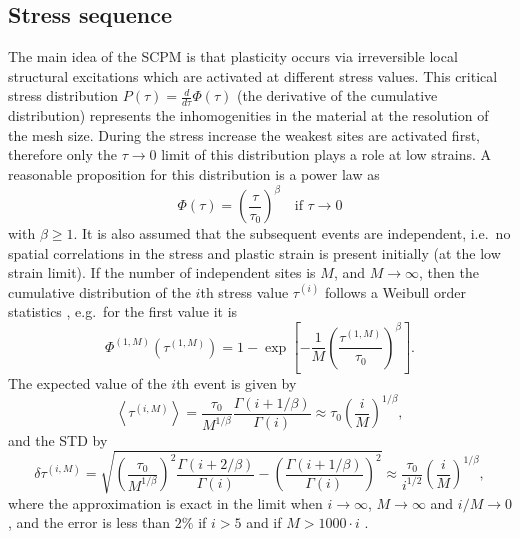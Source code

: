 \subsection{Stress sequence}  \label{sec:weakest_theory_stress_sequence}
The main idea of the SCPM is that plasticity occurs via irreversible local structural excitations which are activated at different stress values. This critical stress distribution $P\left( \tau  \right) = \frac{d}{{d\tau }}\Phi \left( \tau  \right)$ (the derivative of the cumulative distribution) represents the inhomogenities in the material at the resolution of the mesh size. During the stress increase the weakest sites are activated first, therefore only the $\tau  \to 0$ limit of this distribution plays a role at low strains. A reasonable proposition for this distribution \cite{doi:10.1080/14786435.2014.932502} is a power law as
\begin{equation} \label{eq:weakest_cumulative_is_power_law}
\Phi \left( \tau  \right) = {\left( {\frac{\tau }{{{\tau _0}}}} \right)^\beta }\quad {\text{if }}\tau  \to 0
\end{equation}
with $\beta \geqslant 1$. It is also assumed that the subsequent events are independent, i.e.\ no spatial correlations in the stress and plastic strain is present initially (at the low strain limit). If the number of independent sites is $M$, and $M \to \infty$, then the cumulative distribution of the $i$th stress value ${\tau ^{\left( i \right)}}$ follows a Weibull order statistics \cite{rinne2008weibull}, e.g.\ for the first value it is
\begin{equation} \label{eq:weakest_spm_stress_cumul}
{\Phi ^{\left( {1,M} \right)}}\left( {{\tau ^{\left( {1,M} \right)}}} \right) = 1 - \exp \left[ { - \frac{1}{M}{{\left( {\frac{{{\tau ^{\left( {1,M} \right)}}}}{{{\tau _0}}}} \right)}^\beta }} \right].
\end{equation}
The expected value of the $i$th event is given by
\begin{equation}  \label{eq:weakest_spm_stress_expect}
\left\langle {{\tau ^{\left( {i,M} \right)}}} \right\rangle  = \frac{{{\tau _0}}}{{{M^{1/\beta }}}}\frac{{\Gamma \left( {i + 1/\beta } \right)}}{{\Gamma \left( i \right)}} \approx {\tau _0}{\left( {\frac{i}{M}} \right)^{1/\beta }},
\end{equation}
and the STD by
\begin{equation}  \label{eq:weakest_spm_stress_deviat}
\delta {\tau ^{\left( {i,M} \right)}} = \sqrt {{{\left( {\frac{{{\tau _0}}}{{{M^{1/\beta }}}}} \right)}^2}\frac{{\Gamma \left( {i + 2/\beta } \right)}}{{\Gamma \left( i \right)}} - {{\left( {\frac{{\Gamma \left( {i + 1/\beta } \right)}}{{\Gamma \left( i \right)}}} \right)}^2}}  \approx \frac{{{\tau _0}}}{{{i^{1/2}}}}{\left( {\frac{i}{M}} \right)^{1/\beta }},
\end{equation}
where the approximation is exact in the limit when $i \to \infty$, $M \to \infty$ and $i/M \to 0$, and the error is less than $2\%$ if $i>5$ and if $M > 1000 \cdot i$ \citep[Sec. 6.1.47.]{abramowitz1964handbook}.


